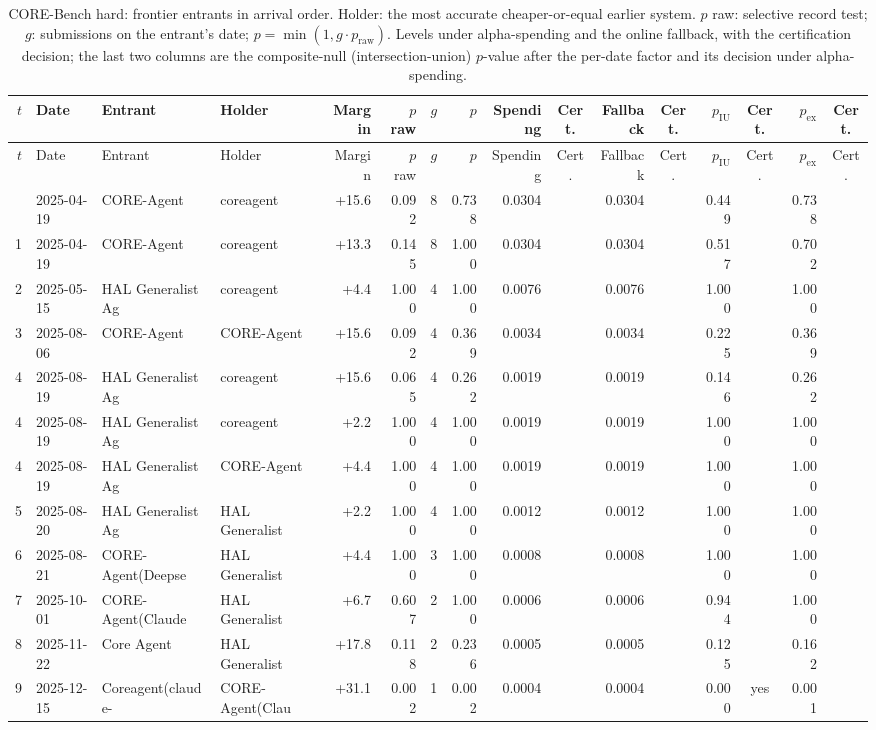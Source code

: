 {\begin{longtable}{rlllrrrrrcrcrcrc}
\caption{CORE-Bench hard: frontier entrants in arrival order. Holder: the most accurate cheaper-or-equal earlier system. $p$ raw: selective record test; $g$: submissions on the entrant's date; $p = \min(1, g \cdot p_{\mathrm{raw}})$. Levels under alpha-spending and the online fallback, with the certification decision; the last two columns are the composite-null (intersection-union) $p$-value after the per-date factor and its decision under alpha-spending.}\label{tab:supp-cert-hal_corebench_hard}\\
\toprule
$t$ & Date & Entrant & Holder & Margin & $p$ raw & $g$ & $p$ & Spending & Cert. & Fallback & Cert. & $p_{\mathrm{IU}}$ & Cert. & $p_{\mathrm{ex}}$ & Cert. \\
\midrule
\endfirsthead
\toprule
$t$ & Date & Entrant & Holder & Margin & $p$ raw & $g$ & $p$ & Spending & Cert. & Fallback & Cert. & $p_{\mathrm{IU}}$ & Cert. & $p_{\mathrm{ex}}$ & Cert. \\
\midrule
\endhead
\bottomrule
\endfoot
1 & 2025-04-19 & CORE-Agent & coreagent & +15.6 & 0.092 & 8 & 0.738 & 0.0304 &  & 0.0304 &  & 0.449 &  & 0.738 &  \\
1 & 2025-04-19 & CORE-Agent & coreagent & +13.3 & 0.145 & 8 & 1.000 & 0.0304 &  & 0.0304 &  & 0.517 &  & 0.702 &  \\
2 & 2025-05-15 & HAL Generalist Ag~ & coreagent & +4.4 & 1.000 & 4 & 1.000 & 0.0076 &  & 0.0076 &  & 1.000 &  & 1.000 &  \\
3 & 2025-08-06 & CORE-Agent & CORE-Agent & +15.6 & 0.092 & 4 & 0.369 & 0.0034 &  & 0.0034 &  & 0.225 &  & 0.369 &  \\
4 & 2025-08-19 & HAL Generalist Ag~ & coreagent & +15.6 & 0.065 & 4 & 0.262 & 0.0019 &  & 0.0019 &  & 0.146 &  & 0.262 &  \\
4 & 2025-08-19 & HAL Generalist Ag~ & coreagent & +2.2 & 1.000 & 4 & 1.000 & 0.0019 &  & 0.0019 &  & 1.000 &  & 1.000 &  \\
4 & 2025-08-19 & HAL Generalist Ag~ & CORE-Agent & +4.4 & 1.000 & 4 & 1.000 & 0.0019 &  & 0.0019 &  & 1.000 &  & 1.000 &  \\
5 & 2025-08-20 & HAL Generalist Ag~ & HAL Generalist ~ & +2.2 & 1.000 & 4 & 1.000 & 0.0012 &  & 0.0012 &  & 1.000 &  & 1.000 &  \\
6 & 2025-08-21 & CORE-Agent(Deepse~ & HAL Generalist ~ & +4.4 & 1.000 & 3 & 1.000 & 0.0008 &  & 0.0008 &  & 1.000 &  & 1.000 &  \\
7 & 2025-10-01 & CORE-Agent(Claude~ & HAL Generalist ~ & +6.7 & 0.607 & 2 & 1.000 & 0.0006 &  & 0.0006 &  & 0.944 &  & 1.000 &  \\
8 & 2025-11-22 & Core Agent & HAL Generalist ~ & +17.8 & 0.118 & 2 & 0.236 & 0.0005 &  & 0.0005 &  & 0.125 &  & 0.162 &  \\
9 & 2025-12-15 & Coreagent(claude-~ & CORE-Agent(Clau~ & +31.1 & 0.002 & 1 & 0.002 & 0.0004 &  & 0.0004 &  & 0.000 & yes & 0.001 &  \\
\end{longtable}

}
